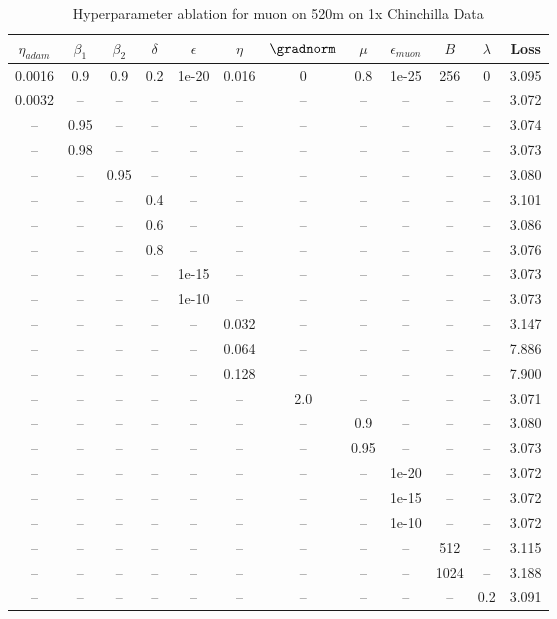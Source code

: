 \begin{table}[h!]
\centering
\caption{Hyperparameter ablation for muon on 520m on 1x Chinchilla Data}
\label{tab:ablation_muon_520m_on_1x_chinchilla_data}
\begin{tabular}{cccccccccccc}
\toprule
$\eta_{adam}$ & $\beta_1$ & $\beta_2$ & $\delta$ & $\epsilon$ & $\eta$ & $\gradnorm$ & $\mu$ & $\epsilon_{muon}$ & $B$ & $\lambda$ & Loss \\
\midrule
0.0016 & 0.9 & 0.9 & 0.2 & 1e-20 & 0.016 & 0 & 0.8 & 1e-25 & 256 & 0 & 3.095 \\
\midrule
0.0032 & -- & -- & -- & -- & -- & -- & -- & -- & -- & -- & 3.072 \\
-- & 0.95 & -- & -- & -- & -- & -- & -- & -- & -- & -- & 3.074 \\
-- & 0.98 & -- & -- & -- & -- & -- & -- & -- & -- & -- & 3.073 \\
-- & -- & 0.95 & -- & -- & -- & -- & -- & -- & -- & -- & 3.080 \\
-- & -- & -- & 0.4 & -- & -- & -- & -- & -- & -- & -- & 3.101 \\
-- & -- & -- & 0.6 & -- & -- & -- & -- & -- & -- & -- & 3.086 \\
-- & -- & -- & 0.8 & -- & -- & -- & -- & -- & -- & -- & 3.076 \\
-- & -- & -- & -- & 1e-15 & -- & -- & -- & -- & -- & -- & 3.073 \\
-- & -- & -- & -- & 1e-10 & -- & -- & -- & -- & -- & -- & 3.073 \\
-- & -- & -- & -- & -- & 0.032 & -- & -- & -- & -- & -- & 3.147 \\
-- & -- & -- & -- & -- & 0.064 & -- & -- & -- & -- & -- & 7.886 \\
-- & -- & -- & -- & -- & 0.128 & -- & -- & -- & -- & -- & 7.900 \\
-- & -- & -- & -- & -- & -- & 2.0 & -- & -- & -- & -- & 3.071 \\
-- & -- & -- & -- & -- & -- & -- & 0.9 & -- & -- & -- & 3.080 \\
-- & -- & -- & -- & -- & -- & -- & 0.95 & -- & -- & -- & 3.073 \\
-- & -- & -- & -- & -- & -- & -- & -- & 1e-20 & -- & -- & 3.072 \\
-- & -- & -- & -- & -- & -- & -- & -- & 1e-15 & -- & -- & 3.072 \\
-- & -- & -- & -- & -- & -- & -- & -- & 1e-10 & -- & -- & 3.072 \\
-- & -- & -- & -- & -- & -- & -- & -- & -- & 512 & -- & 3.115 \\
-- & -- & -- & -- & -- & -- & -- & -- & -- & 1024 & -- & 3.188 \\
-- & -- & -- & -- & -- & -- & -- & -- & -- & -- & 0.2 & 3.091 \\
\bottomrule
\end{tabular}
\end{table}

